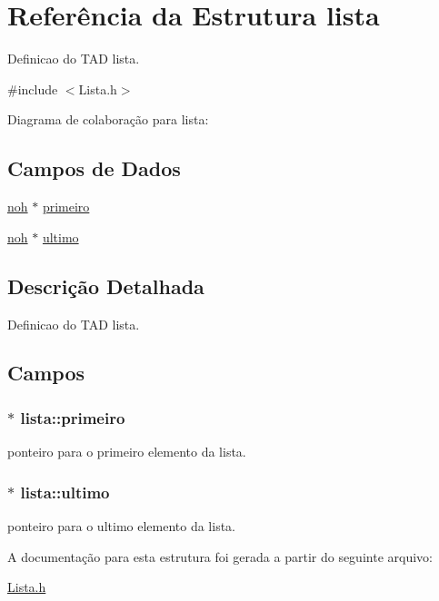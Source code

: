 \hypertarget{structlista}{\section{Referência da Estrutura lista}
\label{structlista}
}


Definicao do T\+A\+D lista.  




{\ttfamily \#include $<$Lista.\+h$>$}



Diagrama de colaboração para lista\+:
\subsection*{Campos de Dados}
\begin{DoxyCompactItemize}
\item 
\hyperlink{Noh_8h_a0d7ef1758ed4704552e1e2020f126654}{noh} $\ast$ \hyperlink{structlista_af8fcb0dc0025c87b32d22d53f69a9b8c}{primeiro}
\item 
\hyperlink{Noh_8h_a0d7ef1758ed4704552e1e2020f126654}{noh} $\ast$ \hyperlink{structlista_a92f7b35d327e15b33866b33acc3b9e67}{ultimo}
\end{DoxyCompactItemize}


\subsection{Descrição Detalhada}
Definicao do T\+A\+D lista. 

\subsection{Campos}
\hypertarget{structlista_af8fcb0dc0025c87b32d22d53f69a9b8c}{
\subsubsection[{primeiro}]{$\ast$ lista\+::primeiro}}\label{structlista_af8fcb0dc0025c87b32d22d53f69a9b8c}
ponteiro para o primeiro elemento da lista. \hypertarget{structlista_a92f7b35d327e15b33866b33acc3b9e67}{
\subsubsection[{ultimo}]{$\ast$ lista\+::ultimo}}\label{structlista_a92f7b35d327e15b33866b33acc3b9e67}
ponteiro para o ultimo elemento da lista. 

A documentação para esta estrutura foi gerada a partir do seguinte arquivo\+:\begin{DoxyCompactItemize}
\item 
\hyperlink{Lista_8h}{Lista.\+h}\end{DoxyCompactItemize}
